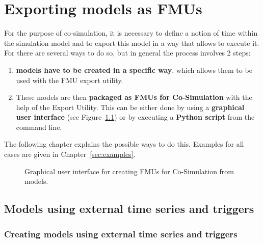 
\chapter{Exporting \pf models as FMUs}
\label{sec:export}

For the purpose of co-simulation, it is necessary to define a notion of time within the simulation model and to export this model in a way that allows to execute it.
For \pf there are several ways to do so, but in general the process involves 2 steps:
\begin{enumerate}

   \item \textbf{\pf models have to be created in a specific way}, which allows them to be used with the \fmipp \pf FMU export utility.
   
   \item These models are then \textbf{packaged as FMUs for Co-Simulation} with the help of the \fmipp \pf Export Utility.
   This can be either done by using a \textbf{graphical user interface} (see Figure~\ref{fig:gui_create}) or by executing a \textbf{Python script} from the command line.

\end{enumerate}
The following chapter explains the possible ways to do this.
Examples for all cases are given in Chapter~\ref{sec:examples}.

\begin{figure}[h!]
\vspace*{-2mm}
\caption{Graphical user interface for creating FMUs for Co-Simulation from \pf models.}
\label{fig:gui_create}
\end{figure}

\section{Models using external time series and triggers}

\subsection{Creating models using external time series and triggers}

